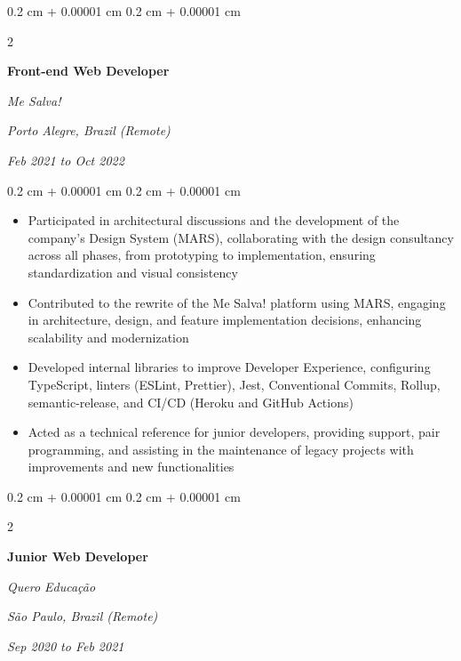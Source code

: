 \documentclass[10pt, a4paper]{article}
\newenvironment{highlights}{
    \begin{itemize}[
        topsep=0.10 cm,
        parsep=0.10 cm,
        partopsep=0pt,
        itemsep=0pt,
        leftmargin=0.4 cm + 10pt
    ]
}{
    \end{itemize}
} %
\newenvironment{onecolentry}{
    \begin{adjustwidth}{
        0.2 cm + 0.00001 cm
    }{
        0.2 cm + 0.00001 cm
    }
}{
    \end{adjustwidth}
} %
\newenvironment{twocolentry}[2][]{
    \onecolentry
    \def\secondColumn{#2}
    \setcolumnwidth{\fill, 7 cm}
    \begin{paracol}{2}
}{
    \switchcolumn \raggedleft \secondColumn
    \end{paracol}
    \endonecolentry
} %
\begin{document}
        \vspace{0.2 cm}

        \begin{twocolentry}{
        \textit{Porto Alegre, Brazil (Remote)}    
            
        \textit{Feb 2021 to Oct 2022}}
            \textbf{Front-end Web Developer}
            
            \textit{Me Salva!}
        \end{twocolentry}

        \vspace{0.10 cm}
        \begin{onecolentry}
            \begin{highlights}
                \item Participated in architectural discussions and the development of the company's Design System (MARS), collaborating with the design consultancy across all phases, from prototyping to implementation, ensuring standardization and visual consistency
                \item Contributed to the rewrite of the Me Salva! platform using MARS, engaging in architecture, design, and feature implementation decisions, enhancing scalability and modernization
                \item Developed internal libraries to improve Developer Experience, configuring TypeScript, linters (ESLint, Prettier), Jest, Conventional Commits, Rollup, semantic-release, and CI/CD (Heroku and GitHub Actions)
                \item Acted as a technical reference for junior developers, providing support, pair programming, and assisting in the maintenance of legacy projects with improvements and new functionalities
            \end{highlights}
        \end{onecolentry}


        \vspace{0.2 cm}

        \begin{twocolentry}{
        \textit{São Paulo, Brazil (Remote)}    
            
        \textit{Sep 2020 to Feb 2021}}
            \textbf{Junior Web Developer}
            
            \textit{Quero Educação}
        \end{twocolentry}
\end{document}
